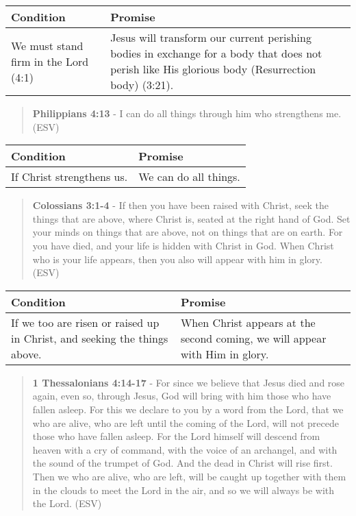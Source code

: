 \documentclass[11pt]{article}
\begin{document}
\begin{center}
\begin{tabular}{ll}
Condition & Promise\\[0pt]
\hline
We must stand firm in the Lord (4:1) & Jesus will transform our current perishing bodies in exchange for a body that does not perish like His glorious body (Resurrection body) (3:21).\\[0pt]
\end{tabular}
\end{center}

\begin{quote}
\textbf{Philippians 4:13} - I can do all things through him who strengthens me. (ESV)
\end{quote}

\begin{center}
\begin{tabular}{ll}
Condition & Promise\\[0pt]
\hline
If Christ strengthens us. & We can do all things.\\[0pt]
\end{tabular}
\end{center}

\begin{quote}
\textbf{Colossians 3:1-4} - If then you have been raised with Christ, seek the things that are above, where Christ is, seated at the right hand of God. Set your minds on things that are above, not on things that are on earth. For you have died, and your life is hidden with Christ in God. When Christ who is your life appears, then you also will appear with him in glory. (ESV)
\end{quote}

\begin{center}
\begin{tabular}{ll}
Condition & Promise\\[0pt]
\hline
If we too are risen or raised up in Christ, and seeking the things above. & When Christ appears at the second coming, we will appear with Him in glory.\\[0pt]
\end{tabular}
\end{center}

\begin{quote}
\textbf{1 Thessalonians 4:14-17} - For since we believe that Jesus died and rose again, even so, through Jesus, God will bring with him those who have fallen asleep. For this we declare to you by a word from the Lord, that we who are alive, who are left until the coming of the Lord, will not precede those who have fallen asleep. For the Lord himself will descend from heaven with a cry of command, with the voice of an archangel, and with the sound of the trumpet of God. And the dead in Christ will rise first. Then we who are alive, who are left, will be caught up together with them in the clouds to meet the Lord in the air, and so we will always be with the Lord. (ESV)
\end{quote}
\end{document}
